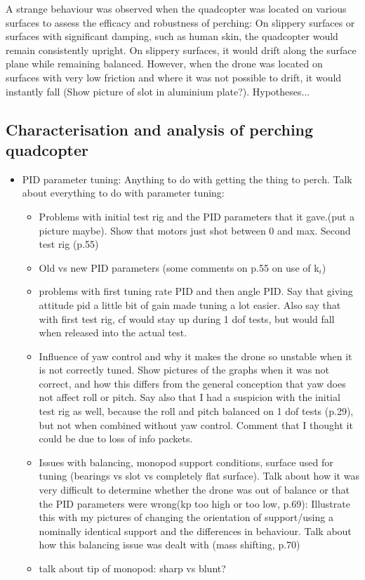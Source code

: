 \documentclass[12pt,a4paper]{article}
\begin{document}
A strange behaviour was observed when the quadcopter was located on various surfaces to assess the efficacy and robustness of perching: On slippery surfaces or surfaces with significant damping, such as human skin, the quadcopter would remain consistently upright. On slippery surfaces, it would drift along the surface plane while remaining balanced. However, when the drone was located on surfaces with very low friction and where it was not possible to drift, it would instantly fall (Show picture of slot in aluminium plate?). Hypotheses...



\subsection{Characterisation and analysis of perching quadcopter}
\begin{itemize}
\item PID parameter tuning: Anything to do with getting the thing to perch. Talk about everything to do with parameter tuning:
\begin{itemize}
\item Problems with initial test rig and the PID parameters that it gave.(put a picture maybe). Show that motors just shot between 0 and max. Second test rig (p.55)
\item Old vs new PID parameters (some comments on p.55 on use of k$_i$)
\item problems with first tuning rate PID and then angle PID. Say that giving attitude pid a little bit of gain made tuning a lot easier. Also say that with first test rig, cf would stay up during 1 dof tests, but would fall when released into the actual test.
\item Influence of yaw control and why it makes the drone so unstable when it is not correctly tuned. Show pictures of the graphs when it was not correct, and how this differs from the general conception that yaw does not affect roll or pitch. Say also that I had a suspicion with the initial test rig as well, because the roll and pitch balanced on 1 dof tests (p.29), but not when combined without yaw control. Comment that I thought it could be due to loss of info packets.
\item Issues with balancing, monopod support conditions, surface used for tuning (bearings vs slot vs completely flat surface). Talk about how it was very difficult to determine whether the drone was out of balance or that the PID parameters were wrong(kp too high or too low, p.69): Illustrate this with my pictures of changing the orientation of support/using a nominally identical support and the differences in behaviour. Talk about how this balancing issue was dealt with (mass shifting, p.70)
\item talk about tip of monopod: sharp vs blunt?


\end{itemize}
\end{itemize}
\end{document}
